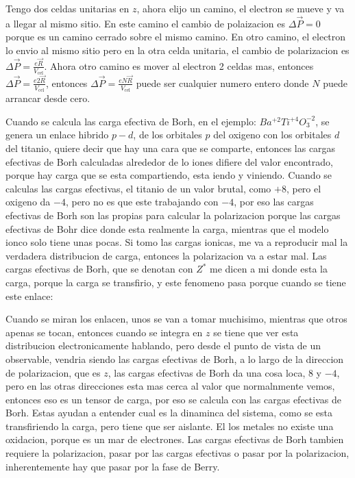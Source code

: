 \documentclass[11pt,fleqn]{book}
\begin{document}

Tengo dos celdas unitarias en $z$, ahora elijo un camino, el electron se mueve y va a llegar al mismo sitio. En este camino el cambio de polaizacion es $\Delta\vec{P}=0$ porque es un camino cerrado sobre el mismo camino. En otro camino, el electron lo envio al mismo sitio pero en la otra celda unitaria, el cambio de polarizacion es $\Delta\vec{P}=\frac{e\vec{R}}{V_{\text{cel}}}$. Ahora otro camino es mover al electron 2 celdas mas, entonces $\Delta\vec{P}=\frac{e2\vec{R}}{V_{\text{cel}}}$, entonces $\Delta\vec{P}=\frac{eN\vec{R}}{V_{\text{cel}}}$ puede ser cualquier numero entero donde $N$ puede arrancar desde cero.




Cuando se calcula las carga efectiva de Borh, en el ejemplo: $Ba^{+2}Ti^{+4}O_{3}^{-2}$, se genera un enlace hibrido $p-d$, de los orbitales $p$ del oxigeno con los orbitales $d$ del titanio, quiere decir que hay una cara que se comparte, entonces las cargas efectivas de Borh calculadas alrededor de lo iones difiere del valor encontrado, porque hay carga que se esta compartiendo, esta iendo y viniendo. Cuando se calculas las cargas efectivas, el titanio de un valor brutal, como $+8$, pero el oxigeno da $-4$, pero no es que este trabajando con $-4$, por eso las cargas efectivas de Borh son las propias para calcular la polarizacion porque las cargas efectivas de Bohr dice donde esta realmente la carga, mientras que el modelo ionco solo tiene unas pocas. Si tomo las cargas ionicas, me va a reproducir mal la verdadera distribucion de carga, entonces la polarizacion va a estar mal. Las cargas efectivas de Borh, que se denotan con $Z^{\ast}$ me dicen a mi donde esta la carga, porque la carga se transfirio, y este fenomeno pasa porque cuando se tiene este enlace:


Cuando se miran los enlacen, unos se van a tomar muchisimo, mientras que otros apenas se tocan, entonces cuando se integra en $z$ se tiene que ver esta distribucion electronicamente hablando, pero desde el punto de vista de un observable, vendria siendo las cargas efectivas de Borh, a lo largo de la direccion de polarizacion, que es $z$, las cargas efectivas de Borh da una cosa loca, $8$ y $-4$, pero en las otras direcciones esta mas cerca al valor que normalnmente vemos, entonces eso es un tensor de carga, por eso se calcula con las cargas efectivas de Borh. Estas ayudan a entender cual es la dinaminca del sistema, como se esta transfiriendo la carga, pero tiene que ser aislante. El los metales no existe una oxidacion, porque es un mar de electrones. Las cargas efectivas de Borh tambien requiere la polarizacion, pasar por las cargas efectivas o pasar por la polarizacion, inherentemente hay que pasar por la fase de Berry.
\end{document}
